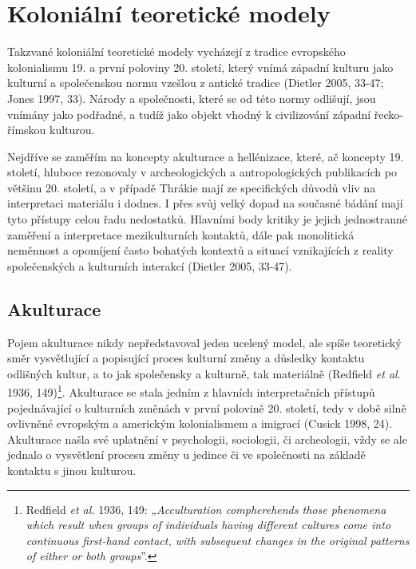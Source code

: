\section[koloniální-teoretické-modely]{Koloniální teoretické modely}

Takzvané koloniální teoretické modely vycházejí z tradice evropského kolonialismu 19. a první poloviny 20. století, který vnímá západní kulturu jako kulturní a společenskou normu vzešlou z antické tradice (Dietler 2005, 33-47; Jones 1997, 33). Národy a společnosti, které se od této normy odlišují, jsou vnímány jako podřadné, a tudíž jako objekt vhodný k civilizování západní řecko-římskou kulturou.

Nejdříve se zaměřím na koncepty akulturace a hellénizace, které, ač koncepty 19. století, hluboce rezonovaly v archeologických a antropologických publikacích po většinu 20. století, a v případě Thrákie mají ze specifických důvodů vliv na interpretaci materiálu i dodnes. I přes svůj velký dopad na současné bádání mají tyto přístupy celou řadu nedostatků. Hlavními body kritiky je jejich jednostranné zaměření a interpretace mezikulturních kontaktů, dále pak monolitická neměnnost a opomíjení často bohatých kontextů a situací vznikajících z reality společenských a kulturních interakcí (Dietler 2005, 33-47).

\subsection[akulturace]{Akulturace}

Pojem akulturace nikdy nepředstavoval jeden ucelený model, ale spíše teoretický směr vysvětlující a popisující proces kulturní změny a důsledky kontaktu odlišných kultur, a to jak společensky a kulturně, tak materiálně (Redfield {\em et al}. 1936, 149)\footnote{Redfield {\em et al.} 1936, 149: „{\em Acculturation compherehends those phenomena which result when groups of individuals having different cultures come into continuous first-hand contact, with subsequent changes in the original patterns of either or both groups}”.}. Akulturace se stala jedním z hlavních interpretačních přístupů pojednávající o kulturních změnách v první polovině 20. století, tedy v době silně ovlivněné evropským a americkým kolonialismem a imigrací (Cusick 1998, 24). Akulturace našla své uplatnění v psychologii, sociologii, či archeologii, vždy se ale jednalo o vysvětlení procesu změny u jedince či ve společnosti na základě kontaktu s jinou kulturou.

